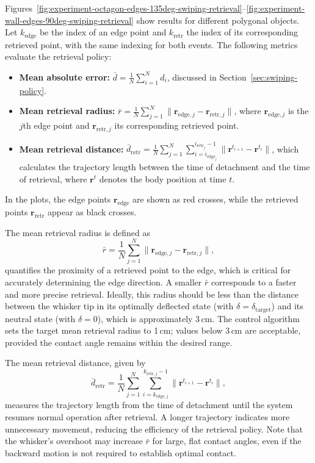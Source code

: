 Figures~\ref{fig:experiment-octagon-edges-135deg-swiping-retrieval}--\ref{fig:experiment-wall-edges-90deg-swiping-retrieval} show results for different polygonal objects.
Let $k_{\mathrm{edge}}$ be the index of an edge point and $k_{\mathrm{retr}}$ the index of its corresponding retrieved point, with the same indexing for both events.
The following metrics evaluate the retrieval policy:
\begin{itemize}
    \item \textbf{Mean absolute error:} $\bar{d} = \frac{1}{N}\sum_{i=1}^{N} d_i$, discussed in Section~\ref{sec:swiping-policy}.
    \item \textbf{Mean retrieval radius:} $\bar{r} = \frac{1}{N}\sum_{j=1}^{N} \|\mathbf{r}_{\mathrm{edge},j} - \mathbf{r}_{\mathrm{retr},j}\|$, where $\mathbf{r}_{\mathrm{edge},j}$ is the $j$th edge point and $\mathbf{r}_{\mathrm{retr},j}$ its corresponding retrieved point.
    \item \textbf{Mean retrieval distance:} $\bar{d}_{\mathrm{retr}} = \frac{1}{N}\sum_{j=1}^{N}\sum_{i=i_{\mathrm{edge}_j}}^{i_{\mathrm{retr}_j}-1} \|\mathbf{r}^{t_{i+1}} - \mathbf{r}^{t_i}\|$, which calculates the trajectory length between the time of detachment and the time of retrieval, where $\mathbf{r}^{t}$ denotes the body position at time $t$.
\end{itemize}
In the plots, the edge points $\mathbf{r}_{\mathrm{edge}}$ are shown as red crosses, while the retrieved points $\mathbf{r}_{\mathrm{retr}}$ appear as black crosses.

The mean retrieval radius is defined as
\[
    \bar{r} = \frac{1}{N}\sum_{j=1}^{N} \|\mathbf{r}_{\mathrm{edge},j} - \mathbf{r}_{\mathrm{retr},j}\|,
\]
quantifies the proximity of a retrieved point to the edge, which is critical for accurately determining the edge direction.
A smaller $\bar{r}$ corresponds to a faster and more precise retrieval.
Ideally, this radius should be less than the distance between the whisker tip in its optimally deflected state (with $\delta=\delta_{\mathrm{target}}$) and its neutral state (with $\delta=0$), which is approximately 3\,cm.
The control algorithm sets the target mean retrieval radius to 1\,cm; values below 3\,cm are acceptable, provided the contact angle remains within the desired range.

The mean retrieval distance, given by
\[
    \bar{d}_{\mathrm{retr}} = \frac{1}{N}\sum_{j=1}^{N}\sum_{i=k_{\mathrm{edge},j}}^{k_{\mathrm{retr},j}-1} \|\mathbf{r}^{t_{i+1}} - \mathbf{r}^{t_i}\|,
\]
measures the trajectory length from the time of detachment until the system resumes normal operation after retrieval.
A longer trajectory indicates more unnecessary movement, reducing the efficiency of the retrieval policy.
Note that the whisker's overshoot may increase $\bar{r}$ for large, flat contact angles, even if the backward motion is not required to establish optimal contact.

